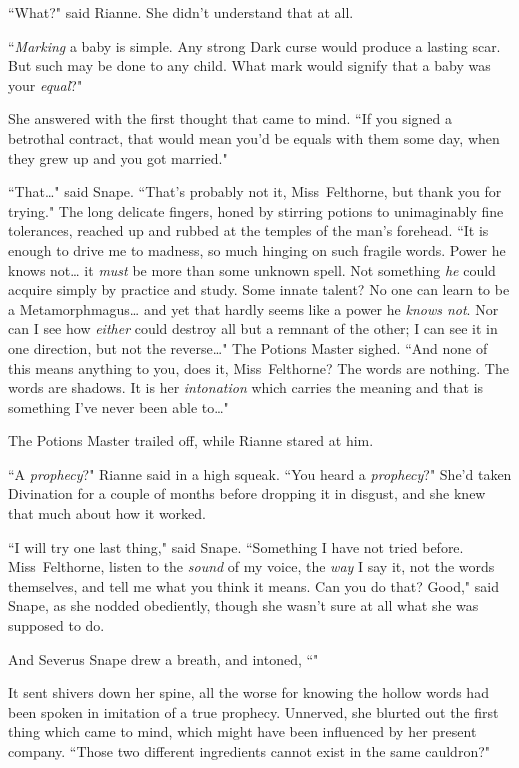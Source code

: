 ``What?" said Rianne. She didn't understand that at all.

``\emph{Marking} a baby is simple. Any strong Dark curse would produce a lasting scar. But such may be done to any child. What mark would signify that a baby was your \emph{equal}?"

She answered with the first thought that came to mind. ``If you signed a betrothal contract, that would mean you'd be equals with them some day, when they grew up and you got married."

``That{\ldots}" said Snape. ``That's probably not it, Miss~Felthorne, but thank you for trying." The long delicate fingers, honed by stirring potions to unimaginably fine tolerances, reached up and rubbed at the temples of the man's forehead. ``It is enough to drive me to madness, so much hinging on such fragile words. Power he knows not{\ldots} it \emph{must} be more than some unknown spell. Not something \emph{he} could acquire simply by practice and study. Some innate talent? No one can learn to be a Metamorphmagus{\ldots} and yet that hardly seems like a power he \emph{knows not}. Nor can I see how \emph{either} could destroy all but a remnant of the other; I can see it in one direction, but not the reverse{\ldots}" The Potions Master sighed. ``And none of this means anything to you, does it, Miss~Felthorne? The words are nothing. The words are shadows. It is her \emph{intonation} which carries the meaning and that is something I've never been able to{\ldots}"

The Potions Master trailed off, while Rianne stared at him.

``A \emph{prophecy}?" Rianne said in a high squeak. ``You heard a \emph{prophecy}?" She'd taken Divination for a couple of months before dropping it in disgust, and she knew that much about how it worked.

``I will try one last thing," said Snape. ``Something I have not tried before. Miss~Felthorne, listen to the \emph{sound} of my voice, the \emph{way} I say it, not the words themselves, and tell me what you think it means. Can you do that? Good," said Snape, as she nodded obediently, though she wasn't sure at all what she was supposed to do.

And Severus Snape drew a breath, and intoned, ``"

It sent shivers down her spine, all the worse for knowing the hollow words had been spoken in imitation of a true prophecy. Unnerved, she blurted out the first thing which came to mind, which might have been influenced by her present company. ``Those two different ingredients cannot exist in the same cauldron?"

